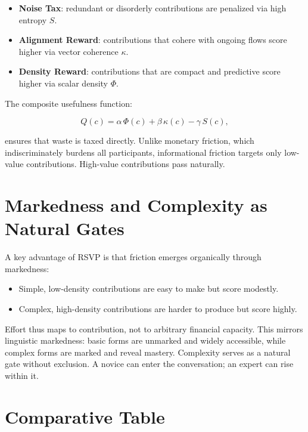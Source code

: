 \documentclass[openany]{book}
\begin{document}
\begin{itemize}
    \item \textbf{Noise Tax}: redundant or disorderly contributions are penalized via high entropy $S$.
    \item \textbf{Alignment Reward}: contributions that cohere with ongoing flows score higher via vector coherence $\kappa$.
    \item \textbf{Density Reward}: contributions that are compact and predictive score higher via scalar density $\Phi$.
\end{itemize}

The composite usefulness function:

\[ Q(c) = \alpha \, \Phi(c) + \beta \, \kappa(c) - \gamma \, S(c), \]

ensures that waste is taxed directly. Unlike monetary friction, which indiscriminately burdens all participants, informational friction targets only low-value contributions. High-value contributions pass naturally.

\section{Markedness and Complexity as Natural Gates}

A key advantage of RSVP is that friction emerges organically through markedness:

\begin{itemize}
    \item Simple, low-density contributions are easy to make but score modestly.
    \item Complex, high-density contributions are harder to produce but score highly.
\end{itemize}

Effort thus maps to contribution, not to arbitrary financial capacity. This mirrors linguistic markedness: basic forms are unmarked and widely accessible, while complex forms are marked and reveal mastery. Complexity serves as a natural gate without exclusion. A novice can enter the conversation; an expert can rise within it.

\section{Comparative Table}
\end{document}

